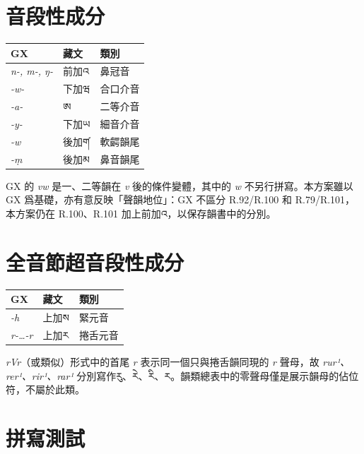 \documentclass[12pt]{nextart_zh}
\begin{document}
\section{音段性成分}
\begin{center}
\small
\renewcommand{\arraystretch}{1.12}
\setlength{\tabcolsep}{6pt}
\begin{tabular}{lll}
\toprule
\textbf{GX} & \textbf{藏文} & \textbf{類別} \\
\midrule
\emph{n-, m-, ŋ-} & 前加འ & 鼻冠音 \\
\emph{-w-} & 下加ཝ & 合口介音 \\
\emph{-a-} & ཨ & 二等介音 \\
\emph{-y-} & 下加ཡ & 細音介音 \\
\emph{-w} & 後加ག༹ & 軟齶韻尾 \\
\emph{-ṃ} & 後加མ & 鼻音韻尾 \\
\bottomrule
\end{tabular}
\end{center}

GX 的 \emph{vw} 是一、二等韻在 \emph{v} 後的條件變體，其中的 \emph{w} 不另行拼寫。本方案雖以 GX 爲基礎，亦有意反映「聲韻地位」：GX 不區分 R.92/R.100 和 R.79/R.101，本方案仍在 R.100、R.101 加上前加འ，以保存韻書中的分別。

\section{全音節超音段性成分}
\begin{center}
\small
\renewcommand{\arraystretch}{1.12}
\setlength{\tabcolsep}{6pt}
\begin{tabular}{lll}
\toprule
\textbf{GX} & \textbf{藏文} & \textbf{類別} \\
\midrule
\emph{-h} & 上加ས  & 緊元音 \\
\emph{r-\ldots-r} & 上加ར & 捲舌元音 \\
\bottomrule
\end{tabular}
\end{center}

\emph{rVr}（或類似）形式中的首尾 \emph{r} 表示同一個只與捲舌韻同現的 \emph{r} 聲母，故 \emph{rur¹、rer¹、rir¹、rar¹} 分別寫作རུ、རེ、རི、ར。韻類總表中的零聲母僅是展示韻母的佔位符，不屬於此類。

\section{拼寫測試}
\end{document}
